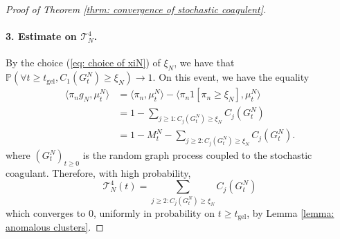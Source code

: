 \begin{proof}[Proof of Theorem \ref{thrm: convergence of stochastic coagulent}]
       \paragraph{3. Estimate on $\mathcal{T}^4_N$.} By the choice (\ref{eq: choice of xiN}) of $\xi_N$, we have that $\mathbb{P}(\forall  t\geq t_\text{gel}, C_1(G^N_t)\geq \xi_N)\rightarrow 1.$ On this event, we have the equality \begin{equation}
           \begin{split}
               \langle \pi_n g_N, \mu^N_t\rangle &=\langle \pi_n, \mu^N_t\rangle - \langle \pi_n 1[\pi_n\geq \xi_N], \mu^N_t\rangle \\[2ex] & = 1-\sum_{j\geq 1: C_j(G^N_t)\ge \xi_N} C_j(G^N_t) \\[2ex] & = 1-M^N_t-\sum_{j\ge 2:C_j(G^N_t)\ge \xi_N} C_j(G^N_t). 
           \end{split} 
       \end{equation} where $(G^N_t)_{t\geq 0}$ is the random graph process coupled to the stochastic coagulant. Therefore, with high probability, \begin{equation} \mathcal{T}^4_N(t) = \sum_{j\ge 2:C_j(G^N_t)\ge \xi_N} C_j(G^N_t) \end{equation} which converges to $0$, uniformly in probability on $t\geq t_\text{gel}$, by Lemma \ref{lemma: anomalous clusters}.

\end{proof}
